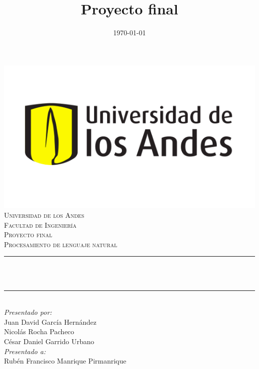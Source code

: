 \documentclass[12pt]{article}
\title{Proyecto final}
\date{\today}
\makeatletter
\let\thetitle\@title
\makeatother
\begin{document}
    \pagestyle{fancy}
    \fancyhf{}

    \renewcommand{\headrulewidth}{0.7pt}
\fancyfoot[R]{\thepage}

\begin{titlepage}
	\centering
    \includegraphics[scale = 0.45]{images/Logo.png}\\[0.5 cm]	%
    \textsc{\large Universidad de los Andes\\
        \vspace{0.2cm} 
        Facultad de Ingeniería\\
        \vspace{0.3cm} 
        Proyecto final}\\[2.0 cm]	%
	\textsc{\Large Procesamiento de lenguaje natural}\\[0.5 cm]
	\rule{\linewidth}{0.2 mm} \\[0.4 cm]
	{ \LARGE \bfseries \thetitle}\\
	\rule{\linewidth}{0.2 mm} \\[1.5 cm]
	
	\large
			\emph{Presentado por:} \\
			Juan David García Hernández\\
			Nicolás Rocha Pacheco\\
			César Daniel Garrido Urbano\\
			
	\vfill
	\large
			\emph{Presentado a:}\\
			Rubén Francisco Manrique Pirmanrique\\
\end{titlepage}
\end{document}

